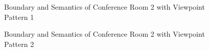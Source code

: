 \documentclass[11pt, a4paper,oneside,chapterprefix=false]{scrbook}
\begin{document}
\begin{figure}[H]
    \centering
      \label{fig:conf2 b 0} \hfill
     \label{fig:conf2 s 0}
    \caption{Boundary and Semantics of Conference Room 2 with Viewpoint Pattern 1}
    \label{fig:conf2 0}
\end{figure}

\begin{figure}[H]
    \centering
      \label{fig:conf2 b 1} \hfill
     \label{fig:conf2 s 1}
    \caption{Boundary and Semantics of Conference Room 2 with Viewpoint Pattern 2}
    \label{fig:conf2 1}
\end{figure}
\end{document}
